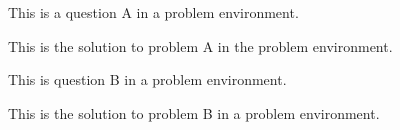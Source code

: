 \begin{problem}
	This is a question A in a problem environment.
	\begin{solution}
		This is the solution to problem A in the problem environment.
	\end{solution}
\end{problem}

\begin{problem}
	This is question B in a problem environment.
	\begin{solution}
		This is the solution to problem B in a problem environment.
	\end{solution}
\end{problem}